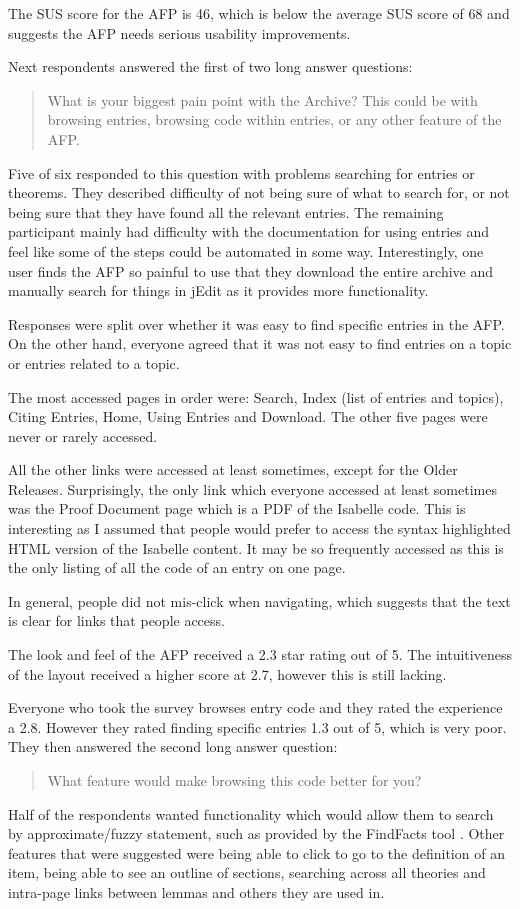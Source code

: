 \documentclass[bsc,frontabs,oneside,singlespacing,parskip,deptreport,logo]{infthesis}
\begin{document}
The SUS score for the AFP is 46, which is below the average SUS score of 68 and suggests the AFP needs serious usability improvements.

Next respondents answered the first of two long answer questions: 
\begin{quote}
    What is your biggest pain point with the Archive? This could be with browsing entries, browsing code within entries, or any other feature of the AFP\@.
\end{quote}
Five of six responded to this question with problems searching for entries or theorems. They described difficulty of not being sure of what to search for, or not being sure that they have found all the relevant entries. The remaining participant mainly had difficulty with the documentation for using entries and feel like some of the steps could be automated in some way. Interestingly, one user finds the AFP so painful to use that they download the entire archive and manually search for things in jEdit as it provides more functionality.

Responses were split over whether it was easy to find specific entries in the AFP\@. On the other hand, everyone agreed that it was not easy to find entries on a topic or entries related to a topic.

The most accessed pages in order were: Search, Index (list of entries and topics), Citing Entries, Home, Using Entries and Download. The other five pages were never or rarely accessed. 

All the other links were accessed at least sometimes, except for the Older Releases. Surprisingly, the only link which everyone accessed at least sometimes was the Proof Document page which is a PDF of the Isabelle code. This is interesting as I assumed that people would prefer to access the syntax highlighted HTML version of the Isabelle content. It may be so frequently accessed as this is the only listing of all the code of an entry on one page.

In general, people did not mis-click when navigating, which suggests that the text is clear for links that people access.

The look and feel of the AFP received a 2.3 star rating out of 5. The intuitiveness of the layout received a higher score at 2.7, however this is still lacking.

Everyone who took the survey browses entry code and they rated the experience a 2.8. However they rated finding specific entries 1.3 out of 5, which is very poor. They then answered the second long answer question: 
\begin{quote}
    What feature would make browsing this code better for you?
\end{quote}
Half of the respondents wanted functionality which would allow them to search by approximate/fuzzy statement, such as provided by the FindFacts tool \cite{HuchKrauss}. Other features that were suggested were being able to click to go to the definition of an item, being able to see an outline of sections, searching across all theories and intra-page links between lemmas and others they are used in.
\end{document}

